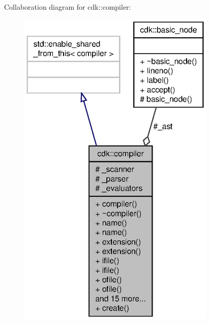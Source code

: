 Collaboration diagram for cdk\+:\+:compiler\+:
\nopagebreak
\begin{figure}[H]
\begin{center}
\leavevmode
\includegraphics[width=268pt]{classcdk_1_1compiler__coll__graph}
\end{center}
\end{figure}
